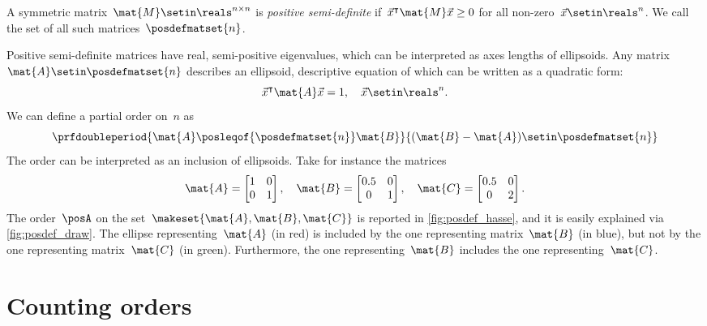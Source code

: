 \begin{definition}
        A symmetric matrix~$\mat{M}\setin \reals^{n\times n}$ is \emph{positive semi-definite} if~$\vec{x}^\intercal \mat{M}\vec{x}\geq 0$ for all non-zero~$\vec{x}\setin \reals^n$.
        We call the set of all such matrices~$\posdefmatset{n}$.
    \end{definition}
    Positive semi-definite matrices have real, semi-positive eigenvalues, which can be interpreted as axes lengths of ellipsoids.
    Any matrix~$\mat{A}\setin \posdefmatset{n}$ describes an ellipsoid, descriptive equation of which can be written as a quadratic form:
    \begin{equation}
        \vec{x}^\intercal \mat{A}\vec{x}=1,\quad \vec{x}\setin \reals^n.
    \end{equation}
    We can define a partial order on~$n$ as
    \begin{equation}
        \prfdoubleperiod{
            \mat{A}\posleqof{\posdefmatset{n}} \mat{B}
        }{
            (\mat{B}-\mat{A})\setin \posdefmatset{n}
        }
    \end{equation}
    The order can be interpreted as an inclusion of ellipsoids.
    Take for instance the matrices
    \begin{equation}
        \mat{A}=
        \begin{bmatrix}
            1 & 0 \\0& 1
        \end{bmatrix}, \quad \mat{B}=
        \begin{bmatrix}
            0.5 & 0 \\0& 1
        \end{bmatrix},\quad \mat{C}=
        \begin{bmatrix}
            0.5 & 0 \\0& 2
        \end{bmatrix}.
    \end{equation}
    The order~$\posA$ on the set~$\makeset{\mat{A},\mat{B},\mat{C}}$ is reported in \cref{fig:posdef_hasse}, and it is easily explained via \cref{fig:posdef_draw}.
    The ellipse representing~$\mat{A}$ (in red) is included by the one representing matrix~$\mat{B}$ (in blue), but not by the one representing matrix~$\mat{C}$ (in green).
    Furthermore, the one representing~$\mat{B}$ includes the one representing~$\mat{C}$.



\section{Counting orders}

